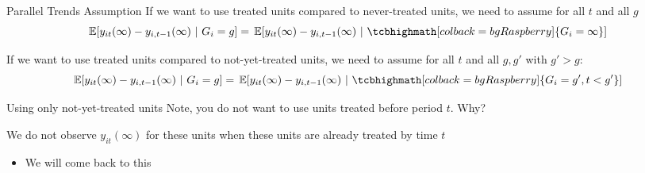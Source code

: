 \documentclass[aspectratio=169,t,11pt,table]{beamer}
\begin{document}
\begin{frame}{Parallel Trends Assumption}
  If we want to use treated units compared to never-treated units, we need to assume for all $t$ and all $g$
  $$
    \expec{y_{it}(\infty) - y_{i,t-1}(\infty)}{G_i = g} = 
    \expec{y_{it}(\infty) - y_{i,t-1}(\infty)}{ \tcbhighmath[colback = bgRaspberry]{G_i = \infty} }
  $$


  \pause
  \bigskip
  If we want to use treated units compared to not-yet-treated units, we need to assume for all $t$ and all $g, g'$ with $g' > g$:
  $$
    \expec{y_{it}(\infty) - y_{i,t-1}(\infty)}{G_i = g} = 
    \expec{y_{it}(\infty) - y_{i,t-1}(\infty)}{ \tcbhighmath[colback = bgRaspberry]{G_i = g', t < g'} }
  $$

\end{frame}

\begin{frame}{Using only not-yet-treated units}
  Note, you do not want to use units treated before period $t$. Why?

  \pause
  We do not observe $y_{it}(\infty)$ for these units when these units are already treated by time $t$
  \begin{itemize}
    \item We will come back to this
  \end{itemize}
\end{frame}
\end{document}
